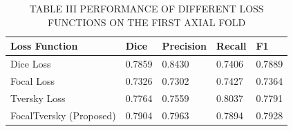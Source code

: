 \begin{table}[htbp]
\centering
\caption{TABLE III PERFORMANCE OF DIFFERENT LOSS FUNCTIONS ON THE FIRST AXIAL FOLD}
\label{tab:table\_003}
\begin{tabular}{lllll}
\hline
Loss Function & Dice & Precision & Recall & F1 \\
\hline
Dice Loss & 0.7859 & 0.8430 & 0.7406 & 0.7889 \\
Focal Loss & 0.7326 & 0.7302 & 0.7427 & 0.7364 \\
Tversky Loss & 0.7764 & 0.7559 & 0.8037 & 0.7791 \\
FocalTversky (Proposed) & 0.7904 & 0.7963 & 0.7894 & 0.7928 \\
\hline
\end{tabular}
\end{table}
